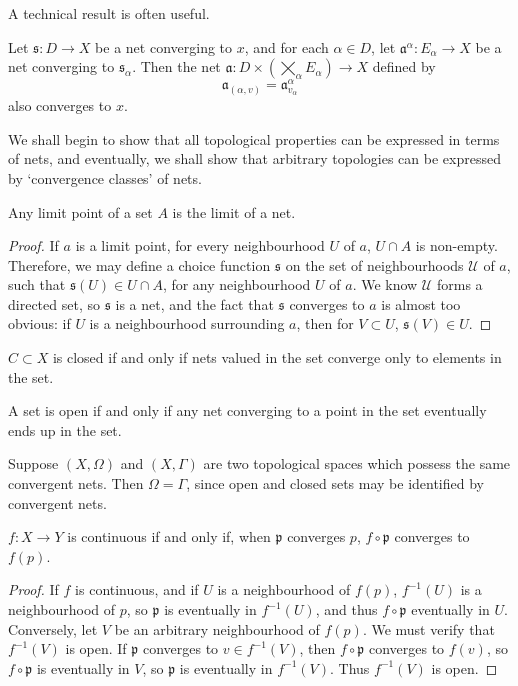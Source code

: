 A technical result is often useful.

\begin{theorem}
    Let $\mathfrak{s}: D \to X$ be a net converging to $x$, and for each $\alpha \in D$, let $\mathfrak{a}^\alpha: E_\alpha \to X$ be a net converging to $\mathfrak{s}_\alpha$. Then the net $\mathfrak{a}: D \times (\bigtimes_\alpha E_\alpha) \to X$ defined by
    \[ \mathfrak{a}_{(\alpha, v)} = \mathfrak{a}^\alpha_{v_\alpha} \]
    also converges to $x$.
\end{theorem}

We shall begin to show that all topological properties can be expressed in terms of nets, and eventually, we shall show that arbitrary topologies can be expressed by `convergence classes' of nets.

\begin{lemma}
    Any limit point of a set $A$ is the limit of a net.
\end{lemma}
\begin{proof}
    If $a$ is a limit point, for every neighbourhood $U$ of $a$, $U \cap A$ is non-empty. Therefore, we may define a choice function $\mathfrak{s}$ on the set of neighbourhoods $\mathcal{U}$ of $a$, such that $\mathfrak{s}(U) \in U \cap A$, for any neighbourhood $U$ of $a$. We know $\mathcal{U}$ forms a directed set, so $\mathfrak{s}$ is a net, and the fact that $\mathfrak{s}$ converges to $a$ is almost too obvious: if $U$ is a neighbourhood surrounding $a$, then for $V \subset U$, $\mathfrak{s}(V) \in U$.
\end{proof}

\begin{corollary}
    $C \subset X$ is closed if and only if nets valued in the set converge only to elements in the set.
\end{corollary}

\begin{corollary}
    A set is open if and only if any net converging to a point in the set eventually ends up in the set.
\end{corollary}

Suppose $(X, \Omega)$ and $(X,\Gamma)$ are two topological spaces which possess the same convergent nets. Then $\Omega = \Gamma$, since open and closed sets may be identified by convergent nets.

\begin{lemma}
    $f:X \to Y$ is continuous if and only if, when $\mathfrak{p}$ converges $p$, $f \circ \mathfrak{p}$ converges to $f(p)$.
\end{lemma}
\begin{proof}
    If $f$ is continuous, and if $U$ is a neighbourhood of $f(p)$, $f^{-1}(U)$ is a neighbourhood of $p$, so $\mathfrak{p}$ is eventually in $f^{-1}(U)$, and thus $f \circ \mathfrak{p}$ eventually in $U$. Conversely, let $V$ be an arbitrary neighbourhood of $f(p)$. We must verify that $f^{-1}(V)$ is open. If $\mathfrak{p}$ converges to $v \in f^{-1}(V)$, then $f \circ \mathfrak{p}$ converges to $f(v)$, so $f \circ \mathfrak{p}$ is eventually in $V$, so $\mathfrak{p}$ is eventually in $f^{-1}(V)$. Thus $f^{-1}(V)$ is open.
\end{proof}

